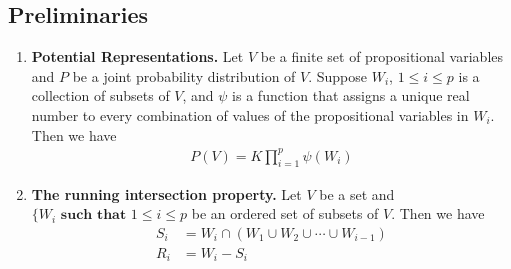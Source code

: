 \documentclass[12pt,twoside]{article}
\begin{document}
\subsection{Preliminaries}
\begin{enumerate}
	\item \textbf{Potential Representations.} Let $V$ be a finite set of propositional variables and $P$ be a joint probability distribution of $V$. Suppose  $W_i$, $1 \leq i \leq p$  is a collection of subsets of $V$, and $\psi$ is a function that assigns a unique real number to every combination of values of the propositional variables in $W_i$. Then we have
	\begin{align*}
		P(V) = K \prod_{i=1}^p \psi(W_i)
	\end{align*}		
	
	\item \textbf{The running intersection property.} Let $V$ be a set and  $\lbrace W_i \textbf{ such that } 1 \leq i \leq p$ be an ordered set of subsets of $V$. Then we have
	\begin{align*}
		S_i &= W_i \cap (W_1\cup W_2\cup \cdots \cup W_{i-1})\\
		R_i & = W_i - S_i
	\end{align*}
\end{enumerate}
\end{document}
